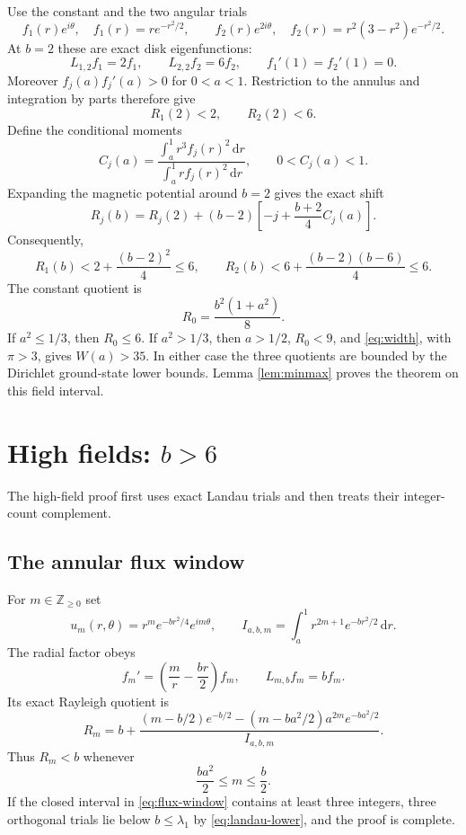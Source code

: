 \documentclass[11pt]{article}
\newcommand{\Z}{\mathbb Z}
\newcommand{\dd}{\,\mathrm d}
\begin{document}
Use the constant and the two angular trials
\begin{equation}\label{eq:mid-trials}
 f_1(r)e^{i\theta},\quad f_1(r)=re^{-r^2/2},
 \qquad
 f_2(r)e^{2i\theta},\quad f_2(r)=r^2(3-r^2)e^{-r^2/2}.
\end{equation}
At $b=2$ these are exact disk eigenfunctions:
\[
 L_{1,2}f_1=2f_1,\qquad L_{2,2}f_2=6f_2,\qquad
 f_1'(1)=f_2'(1)=0.
\]
Moreover $f_j(a)f_j'(a)>0$ for $0<a<1$.  Restriction to the annulus and
integration by parts therefore give
\begin{equation}\label{eq:restriction}
       R_1(2)<2,\qquad R_2(2)<6.
\end{equation}
Define the conditional moments
\[
 C_j(a)=\frac{\int_a^1r^3f_j(r)^2\dd r}
              {\int_a^1r f_j(r)^2\dd r},\qquad 0<C_j(a)<1.
\]
Expanding the magnetic potential around $b=2$ gives the exact shift
\begin{equation}\label{eq:field-shift}
 R_j(b)=R_j(2)+(b-2)\left[-j+\frac{b+2}{4}C_j(a)\right].
\end{equation}
Consequently,
\begin{equation}\label{eq:mid-bounds}
 R_1(b)<2+\frac{(b-2)^2}{4}\leq6,\qquad
 R_2(b)<6+\frac{(b-2)(b-6)}4\leq6.
\end{equation}
The constant quotient is
\[
       R_0=\frac{b^2(1+a^2)}8.
\]
If $a^2\leq1/3$, then $R_0\leq6$.  If $a^2>1/3$, then $a>1/2$,
$R_0<9$, and \eqref{eq:width}, with $\pi>3$, gives $W(a)>35$.  In either
case the three quotients are bounded by the Dirichlet ground-state lower
bounds.  Lemma \ref{lem:minmax} proves the theorem on this field interval.

\section[High fields: b > 6]{High fields: $b>6$}\label{sec:high}

The high-field proof first uses exact Landau trials and then treats their
integer-count complement.

\subsection{The annular flux window}

For $m\in\Z_{\geq0}$ set
\[
 u_m(r,\theta)=r^me^{-br^2/4}e^{im\theta},\qquad
 I_{a,b,m}=\int_a^1r^{2m+1}e^{-br^2/2}\dd r.
\]
The radial factor obeys
\[
 f_m'=\left(\frac mr-\frac{br}{2}\right)f_m,
 \qquad L_{m,b}f_m=bf_m.
\]
Its exact Rayleigh quotient is
\begin{equation}\label{eq:landau-trial}
 R_m=b+\frac{(m-b/2)e^{-b/2}
 -(m-ba^2/2)a^{2m}e^{-ba^2/2}}{I_{a,b,m}}.
\end{equation}
Thus $R_m<b$ whenever
\begin{equation}\label{eq:flux-window}
       \frac{ba^2}{2}\leq m\leq\frac b2.
\end{equation}
If the closed interval in \eqref{eq:flux-window} contains at least three
integers, three orthogonal trials lie below $b\leq\lambda_1$ by
\eqref{eq:landau-lower}, and the proof is complete.
\end{document}

